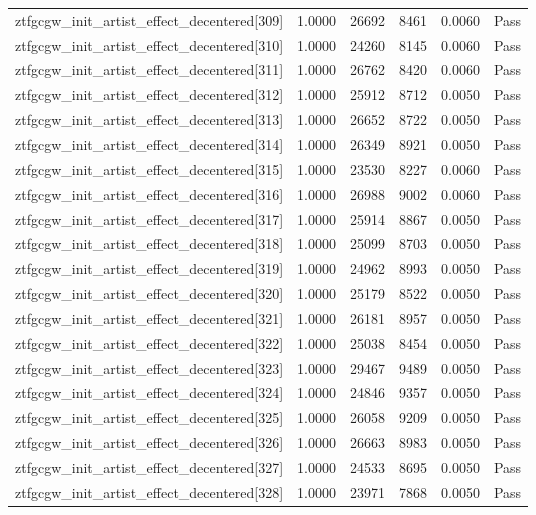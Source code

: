 \begin{table}[htbp]
\begin{tabular}{llrrll}
ztfgcgw\_init\_artist\_effect\_decentered[309] & 1.0000 & 26692 & 8461 & 0.0060 & Pass \\
ztfgcgw\_init\_artist\_effect\_decentered[310] & 1.0000 & 24260 & 8145 & 0.0060 & Pass \\
ztfgcgw\_init\_artist\_effect\_decentered[311] & 1.0000 & 26762 & 8420 & 0.0060 & Pass \\
ztfgcgw\_init\_artist\_effect\_decentered[312] & 1.0000 & 25912 & 8712 & 0.0050 & Pass \\
ztfgcgw\_init\_artist\_effect\_decentered[313] & 1.0000 & 26652 & 8722 & 0.0050 & Pass \\
ztfgcgw\_init\_artist\_effect\_decentered[314] & 1.0000 & 26349 & 8921 & 0.0050 & Pass \\
ztfgcgw\_init\_artist\_effect\_decentered[315] & 1.0000 & 23530 & 8227 & 0.0060 & Pass \\
ztfgcgw\_init\_artist\_effect\_decentered[316] & 1.0000 & 26988 & 9002 & 0.0060 & Pass \\
ztfgcgw\_init\_artist\_effect\_decentered[317] & 1.0000 & 25914 & 8867 & 0.0050 & Pass \\
ztfgcgw\_init\_artist\_effect\_decentered[318] & 1.0000 & 25099 & 8703 & 0.0050 & Pass \\
ztfgcgw\_init\_artist\_effect\_decentered[319] & 1.0000 & 24962 & 8993 & 0.0050 & Pass \\
ztfgcgw\_init\_artist\_effect\_decentered[320] & 1.0000 & 25179 & 8522 & 0.0050 & Pass \\
ztfgcgw\_init\_artist\_effect\_decentered[321] & 1.0000 & 26181 & 8957 & 0.0050 & Pass \\
ztfgcgw\_init\_artist\_effect\_decentered[322] & 1.0000 & 25038 & 8454 & 0.0050 & Pass \\
ztfgcgw\_init\_artist\_effect\_decentered[323] & 1.0000 & 29467 & 9489 & 0.0050 & Pass \\
ztfgcgw\_init\_artist\_effect\_decentered[324] & 1.0000 & 24846 & 9357 & 0.0050 & Pass \\
ztfgcgw\_init\_artist\_effect\_decentered[325] & 1.0000 & 26058 & 9209 & 0.0050 & Pass \\
ztfgcgw\_init\_artist\_effect\_decentered[326] & 1.0000 & 26663 & 8983 & 0.0050 & Pass \\
ztfgcgw\_init\_artist\_effect\_decentered[327] & 1.0000 & 24533 & 8695 & 0.0050 & Pass \\
ztfgcgw\_init\_artist\_effect\_decentered[328] & 1.0000 & 23971 & 7868 & 0.0050 & Pass \\

\end{tabular}
\end{table}
